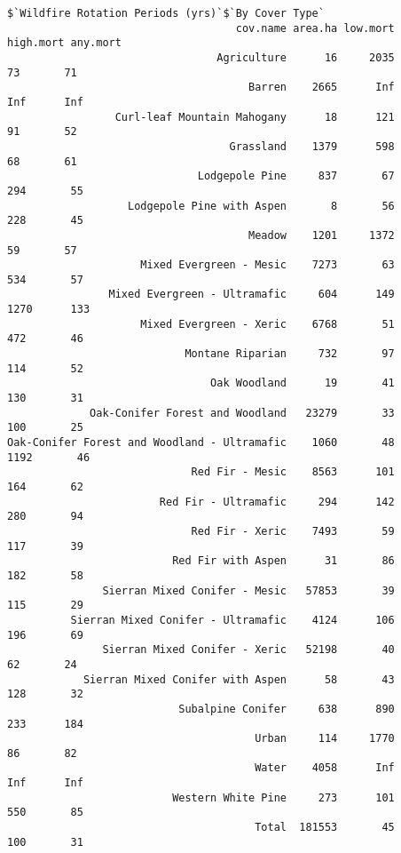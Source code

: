 \begin{verbatim}
$`Wildfire Rotation Periods (yrs)`$`By Cover Type`
                                    cov.name area.ha low.mort high.mort any.mort
                                 Agriculture      16     2035        73       71
                                      Barren    2665      Inf       Inf      Inf
                 Curl-leaf Mountain Mahogany      18      121        91       52
                                   Grassland    1379      598        68       61
                              Lodgepole Pine     837       67       294       55
                   Lodgepole Pine with Aspen       8       56       228       45
                                      Meadow    1201     1372        59       57
                     Mixed Evergreen - Mesic    7273       63       534       57
                Mixed Evergreen - Ultramafic     604      149      1270      133
                     Mixed Evergreen - Xeric    6768       51       472       46
                            Montane Riparian     732       97       114       52
                                Oak Woodland      19       41       130       31
             Oak-Conifer Forest and Woodland   23279       33       100       25
Oak-Conifer Forest and Woodland - Ultramafic    1060       48      1192       46
                             Red Fir - Mesic    8563      101       164       62
                        Red Fir - Ultramafic     294      142       280       94
                             Red Fir - Xeric    7493       59       117       39
                          Red Fir with Aspen      31       86       182       58
               Sierran Mixed Conifer - Mesic   57853       39       115       29
          Sierran Mixed Conifer - Ultramafic    4124      106       196       69
               Sierran Mixed Conifer - Xeric   52198       40        62       24
            Sierran Mixed Conifer with Aspen      58       43       128       32
                           Subalpine Conifer     638      890       233      184
                                       Urban     114     1770        86       82
                                       Water    4058      Inf       Inf      Inf
                          Western White Pine     273      101       550       85
                                       Total  181553       45       100       31
\end{verbatim}


